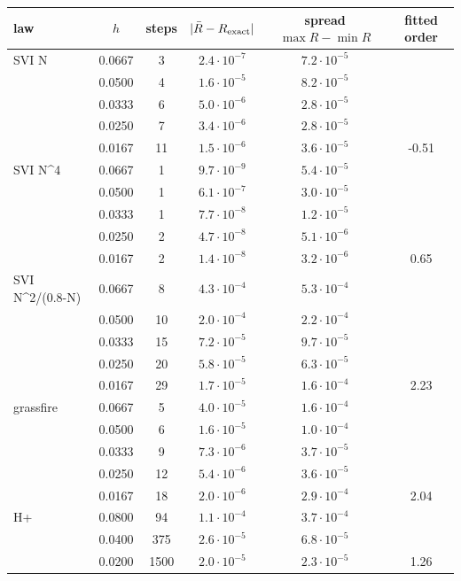 \begin{tabular}{lccccc}
\toprule
law & $h$ & steps & $|\bar R - R_{\rm exact}|$ & spread $\max R-\min R$ & fitted order \\
\midrule
SVI N & 0.0667 & 3 & $2.4\cdot 10^{-7}$ & $7.2\cdot 10^{-5}$ &  \\
 & 0.0500 & 4 & $1.6\cdot 10^{-5}$ & $8.2\cdot 10^{-5}$ &  \\
 & 0.0333 & 6 & $5.0\cdot 10^{-6}$ & $2.8\cdot 10^{-5}$ &  \\
 & 0.0250 & 7 & $3.4\cdot 10^{-6}$ & $2.8\cdot 10^{-5}$ &  \\
 & 0.0167 & 11 & $1.5\cdot 10^{-6}$ & $3.6\cdot 10^{-5}$ & -0.51 \\
\midrule
SVI N\^{}4 & 0.0667 & 1 & $9.7\cdot 10^{-9}$ & $5.4\cdot 10^{-5}$ &  \\
 & 0.0500 & 1 & $6.1\cdot 10^{-7}$ & $3.0\cdot 10^{-5}$ &  \\
 & 0.0333 & 1 & $7.7\cdot 10^{-8}$ & $1.2\cdot 10^{-5}$ &  \\
 & 0.0250 & 2 & $4.7\cdot 10^{-8}$ & $5.1\cdot 10^{-6}$ &  \\
 & 0.0167 & 2 & $1.4\cdot 10^{-8}$ & $3.2\cdot 10^{-6}$ & 0.65 \\
\midrule
SVI N\^{}2/(0.8-N) & 0.0667 & 8 & $4.3\cdot 10^{-4}$ & $5.3\cdot 10^{-4}$ &  \\
 & 0.0500 & 10 & $2.0\cdot 10^{-4}$ & $2.2\cdot 10^{-4}$ &  \\
 & 0.0333 & 15 & $7.2\cdot 10^{-5}$ & $9.7\cdot 10^{-5}$ &  \\
 & 0.0250 & 20 & $5.8\cdot 10^{-5}$ & $6.3\cdot 10^{-5}$ &  \\
 & 0.0167 & 29 & $1.7\cdot 10^{-5}$ & $1.6\cdot 10^{-4}$ & 2.23 \\
\midrule
grassfire & 0.0667 & 5 & $4.0\cdot 10^{-5}$ & $1.6\cdot 10^{-4}$ &  \\
 & 0.0500 & 6 & $1.6\cdot 10^{-5}$ & $1.0\cdot 10^{-4}$ &  \\
 & 0.0333 & 9 & $7.3\cdot 10^{-6}$ & $3.7\cdot 10^{-5}$ &  \\
 & 0.0250 & 12 & $5.4\cdot 10^{-6}$ & $3.6\cdot 10^{-5}$ &  \\
 & 0.0167 & 18 & $2.0\cdot 10^{-6}$ & $2.9\cdot 10^{-4}$ & 2.04 \\
\midrule
H+ & 0.0800 & 94 & $1.1\cdot 10^{-4}$ & $3.7\cdot 10^{-4}$ &  \\
 & 0.0400 & 375 & $2.6\cdot 10^{-5}$ & $6.8\cdot 10^{-5}$ &  \\
 & 0.0200 & 1500 & $2.0\cdot 10^{-5}$ & $2.3\cdot 10^{-5}$ & 1.26 \\

\end{tabular}
